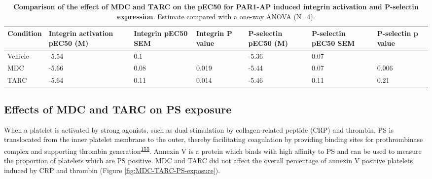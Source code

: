 \documentclass[11pt,twoside]{bristolthesis}
\begin{document}
\begin{table}

\caption[Comparison of the effect of MDC and TARC on the pEC50 for PAR1-AP induced integrin activation and P-selectin expression]{\label{tab:chemokines-integrin-pselectin}\textbf{Comparison of the effect of MDC and TARC on the pEC50 for PAR1-AP induced integrin activation and P-selectin expression}. Estimate compared with a one-way ANOVA (N=4).}
\centering
\fontsize{9}{11}\selectfont
\begin{tabu} to 
\toprule
Condition & Integrin activation pEC50 (M) & Integrin pEC50 SEM & Integrin P value & P-selectin pEC50 (M) & P-selectin pEC50 SEM & P-selectin p value\\
\midrule
Vehicle & -5.54 & 0.1 &  & -5.36 & 0.07 & \\
MDC & -5.66 & 0.08 & 0.019 & -5.44 & 0.07 & 0.006\\
TARC & -5.64 & 0.11 & 0.014 & -5.46 & 0.11 & 0.21\\
\bottomrule
\end{tabu}
\end{table}
\hypertarget{effects-of-mdc-and-tarc-on-ps-exposure}{%
\subsection{Effects of MDC and TARC on PS exposure}\label{effects-of-mdc-and-tarc-on-ps-exposure}}

When a platelet is activated by strong agonists, such as dual stimulation by collagen-related peptide (CRP) and thrombin, PS is translocated from the inner platelet membrane to the outer, thereby facilitating coagulation by providing binding sites for prothrombinase complex and supporting thrombin generation\textsuperscript{\protect\hyperlink{ref-Reddy2020}{155}}. Annexin V is a protein which binds with high affinity to PS and can be used to measure the proportion of platelets which are PS positive. MDC and TARC did not affect the overall percentage of annexin V positive platelets induced by CRP and thrombin (Figure \ref{fig:MDC-TARC-PS-exposure}).
\end{document}
